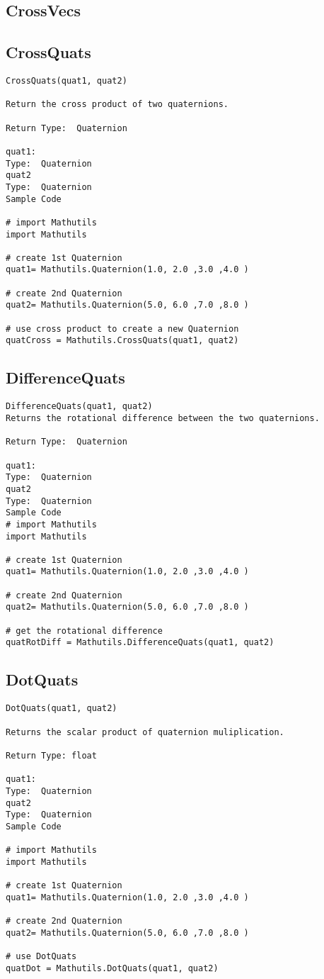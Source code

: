\subsection{CrossVecs}
\subsection{CrossQuats}
\begin{verbatim}
CrossQuats(quat1, quat2)

Return the cross product of two quaternions.

Return Type:  Quaternion

quat1:
Type:  Quaternion 
quat2
Type:  Quaternion 
Sample Code

# import Mathutils
import Mathutils

# create 1st Quaternion 
quat1= Mathutils.Quaternion(1.0, 2.0 ,3.0 ,4.0 )

# create 2nd Quaternion 
quat2= Mathutils.Quaternion(5.0, 6.0 ,7.0 ,8.0 )

# use cross product to create a new Quaternion 
quatCross = Mathutils.CrossQuats(quat1, quat2)
\end{verbatim}

\subsection{DifferenceQuats}
\begin{verbatim}
DifferenceQuats(quat1, quat2)
Returns the rotational difference between the two quaternions. 

Return Type:  Quaternion

quat1:
Type:  Quaternion 
quat2
Type:  Quaternion 
Sample Code
# import Mathutils
import Mathutils

# create 1st Quaternion 
quat1= Mathutils.Quaternion(1.0, 2.0 ,3.0 ,4.0 )

# create 2nd Quaternion 
quat2= Mathutils.Quaternion(5.0, 6.0 ,7.0 ,8.0 )

# get the rotational difference
quatRotDiff = Mathutils.DifferenceQuats(quat1, quat2)
\end{verbatim}

\subsection{DotQuats}
\begin{verbatim}
DotQuats(quat1, quat2)

Returns the scalar product of quaternion muliplication.

Return Type: float

quat1:
Type:  Quaternion 
quat2
Type:  Quaternion 
Sample Code

# import Mathutils
import Mathutils

# create 1st Quaternion 
quat1= Mathutils.Quaternion(1.0, 2.0 ,3.0 ,4.0 )

# create 2nd Quaternion 
quat2= Mathutils.Quaternion(5.0, 6.0 ,7.0 ,8.0 )

# use DotQuats
quatDot = Mathutils.DotQuats(quat1, quat2)
\end{verbatim}

